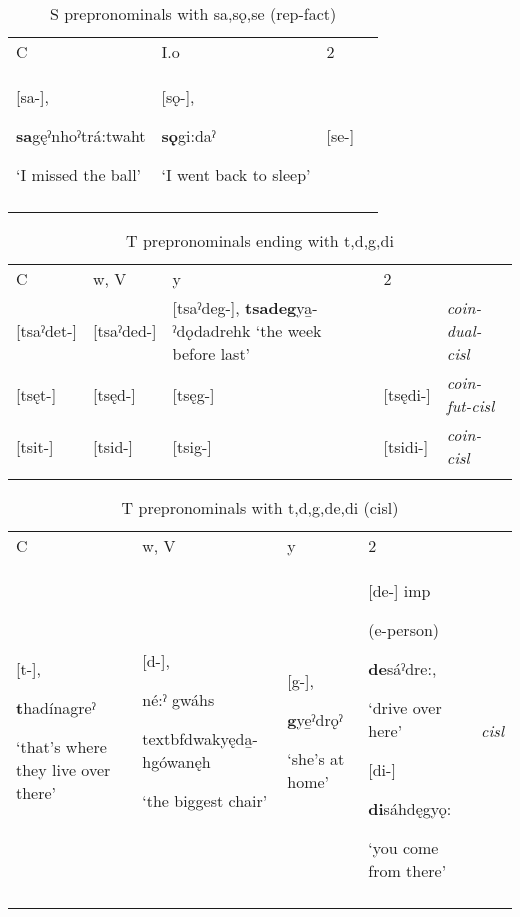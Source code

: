 
\begin{table}
\caption{S prepronominals with sa,sǫ,se (rep-fact)}
\label{tab:1:srepfact}
\scriptsize{
\begin{tabularx}{\textwidth}{XXXX}
\lsptoprule
C & I.o & 2\\
{}[sa-], 

\textbf{sa}gęˀnhoˀtrá:twaht 

‘I missed the ball’ & [sǫ-], 

\textbf{sǫ}gi:daˀ 

‘I went back to sleep’ & [se-]\\
\lspbottomrule
\end{tabularx}}
\end{table}


\begin{table}
\caption{T prepronominals ending with t,d,g,di}
\label{tab:1:coinfutdualcisl}
\scriptsize{
\begin{tabularx}{\textwidth}{XXXXX}
\lsptoprule
C & w, V & y & 2 & \\
{}[tsaˀdet-] & [tsaˀded-] & [tsaˀdeg-], \textbf{tsadeg}ya̱-ˀdǫdadrehk ‘the week before last’ &  & {\itshape coin-dual-cisl}\\
{}[tsęt-] & [tsęd-] & [tsęg-] & [tsędi-] & {\itshape coin-fut-cisl}\\
{}[tsit-] & [tsid-] & [tsig-] & [tsidi-] & {\itshape coin-cisl}\\
\lspbottomrule
\end{tabularx}}
\end{table}



\begin{table}
\caption{T prepronominals with t,d,g,de,di (cisl)}
\label{tab:1:scisl}
\scriptsize{
\begin{tabularx}{\textwidth}{XXXXX}
\lsptoprule
C & w, V & y & 2 & \\
{}[t-], 

\textbf{t}hadínagreˀ 

‘that’s where they live over there’ & [d-], 

né:ˀ gwáhs 

textbf{d}wakyęda̱-hgówanęh

‘the biggest chair’ & [g-], 

\textbf{g}ye̱ˀdrǫˀ

‘she’s at home’ & [de-] imp 

(e-person) 

\textbf{de}sáˀdre:, 

‘drive over here’ 

[di-] 

\textbf{di}sáhdęgyǫ: 

‘you come from there’ & {\itshape cisl}\\
\lspbottomrule
\end{tabularx}}
\end{table}


